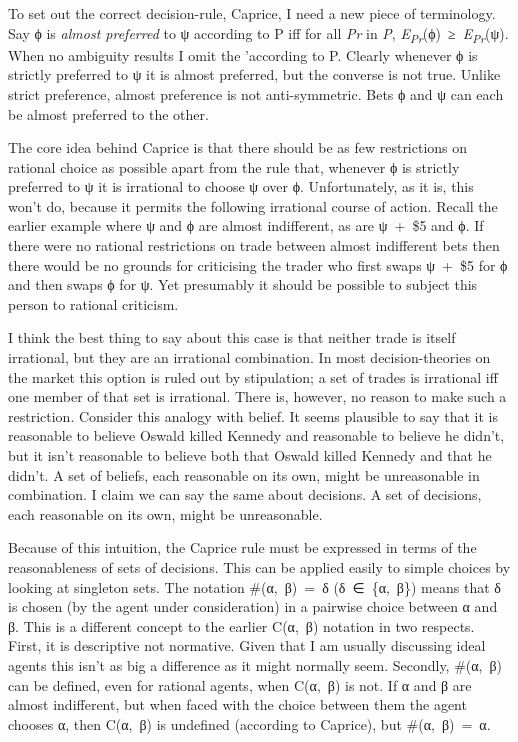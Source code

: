 \documentclass[
  11pt,
  letterpaper,
  DIV=11,
  numbers=noendperiod,
  twoside]{scrartcl}
\begin{document}
To set out the correct decision-rule, Caprice, I need a new piece of
terminology. Say ϕ is \emph{almost preferred} to ψ according to P iff
for all \emph{Pr} in \emph{P},
\emph{E\textsubscript{Pr}}(ϕ)~≥~\emph{E\textsubscript{Pr}}(ψ). When no
ambiguity results I omit the 'according to P. Clearly whenever ϕ is
strictly preferred to ψ it is almost preferred, but the converse is not
true. Unlike strict preference, almost preference is not anti-symmetric.
Bets ϕ and ψ can each be almost preferred to the other.

The core idea behind Caprice is that there should be as few restrictions
on rational choice as possible apart from the rule that, whenever ϕ is
strictly preferred to ψ it is irrational to choose ψ over ϕ.
Unfortunately, as it is, this won't do, because it permits the following
irrational course of action. Recall the earlier example where ψ and ϕ
are almost indifferent, as are ψ~+~\$5 and ϕ. If there were no rational
restrictions on trade between almost indifferent bets then there would
be no grounds for criticising the trader who first swaps ψ~+~\$5 for ϕ
and then swaps ϕ for ψ. Yet presumably it should be possible to subject
this person to rational criticism.

I think the best thing to say about this case is that neither trade is
itself irrational, but they are an irrational combination. In most
decision-theories on the market this option is ruled out by stipulation;
a set of trades is irrational iff one member of that set is irrational.
There is, however, no reason to make such a restriction. Consider this
analogy with belief. It seems plausible to say that it is reasonable to
believe Oswald killed Kennedy and reasonable to believe he didn't, but
it isn't reasonable to believe both that Oswald killed Kennedy and that
he didn't. A set of beliefs, each reasonable on its own, might be
unreasonable in combination. I claim we can say the same about
decisions. A set of decisions, each reasonable on its own, might be
unreasonable.

Because of this intuition, the Caprice rule must be expressed in terms
of the reasonableness of sets of decisions. This can be applied easily
to simple choices by looking at singleton sets. The notation
\#(α,~β)~=~δ (δ~∈~\{α,~β\}) means that δ is chosen (by the agent under
consideration) in a pairwise choice between α and β. This is a different
concept to the earlier C(α,~β) notation in two respects. First, it is
descriptive not normative. Given that I am usually discussing ideal
agents this isn't as big a difference as it might normally seem.
Secondly, \#(α,~β) can be defined, even for rational agents, when
C(α,~β) is not. If α and β are almost indifferent, but when faced with
the choice between them the agent chooses α, then C(α,~β) is undefined
(according to Caprice), but \#(α,~β)~=~α.
\end{document}
